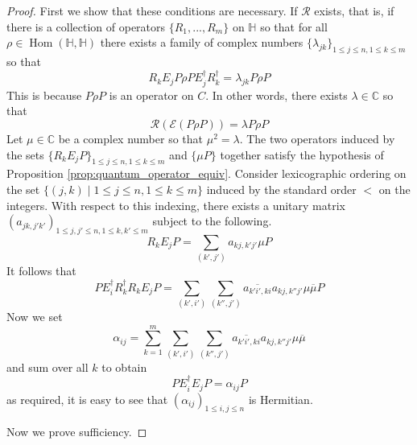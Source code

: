 \documentclass[12pt]{article}
\theoremstyle{plain}
\theoremstyle{definition}
\newcommand{\bb}[1]{\mathbb{#1}}
\newcommand{\call}[1]{\mathcal{#1}}
\begin{document}
\begin{proof}
	First we show that these conditions are necessary. If $\call{R}$ exists, that is, if there is a collection of operators $\lbrace R_1,...,R_m\rbrace$ on $\bb{H}$ so that for all $\rho \in \operatorname{Hom}(\bb{H},\bb{H})$ there exists a family of complex numbers $\lbrace \lambda_{jk}\rbrace_{1 \leq j \leq n, 1 \leq k \leq m}$ so that
	\begin{equation}
		R_k E_j P\rho P E_j^\dagger R_k^\dagger = \lambda_{jk}P\rho P
	\end{equation}
	This is because $P \rho P$ is an operator on $C$. In other words, there exists $\lambda \in \bb{C}$ so that
	\begin{equation}
		\call{R}(\call{E}(P\rho P)) = \lambda P \rho P
	\end{equation}
	Let $\mu \in \bb{C}$ be a complex number so that $\mu^2 = \lambda$. The two operators induced by the sets $\lbrace R_kE_j P \rbrace_{1 \leq j \leq n, 1 \leq k \leq m}$ and $\lbrace \mu P\rbrace$ together satisfy the hypothesis of Proposition \ref{prop:quantum_operator_equiv}. Consider lexicographic ordering on the set $\lbrace (j,k) \mid 1 \leq j \leq n, 1 \leq k \leq m\rbrace$ induced by the standard order $<$ on the integers. With respect to this indexing, there exists a unitary matrix $(a_{jk,j'k'})_{1 \leq j, j' \leq n, 1 \leq k,k' \leq m}$ subject to the following.
	\begin{equation}
		R_kE_j P = \sum_{(k',j')}a_{kj, k'j'} \mu P
	\end{equation}
	It follows that
	\begin{equation}
		P E_{i}^\dagger R_{k}^\dagger R_kE_j P = \sum_{(k',i')}\sum_{(k'',j')}\overline{a_{k'i',ki}}a_{kj,k''j'}\mu\overline{\mu}P
	\end{equation}
	Now we set
	$$\alpha_{ij} = \sum_{k = 1}^m \sum_{(k', i')}\sum_{(k'',j')}\overline{a_{k'i',ki}}a_{kj,k''j'}\mu\overline{\mu}$$
	and sum over all $k$ to obtain
	\begin{equation}
		PE_i^\dagger E_j P = \alpha_{ij}P
	\end{equation}
	as required, it is easy to see that $(\alpha_{ij})_{1 \leq i, j \leq n}$ is Hermitian.
	
	Now we prove sufficiency.
	

\end{proof}
\end{document}
